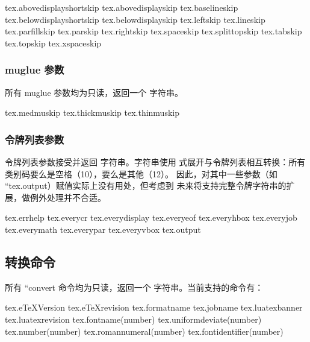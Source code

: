 \startthreecolumns
\begin{typing}
tex.abovedisplayshortskip
tex.abovedisplayskip
tex.baselineskip
tex.belowdisplayshortskip
tex.belowdisplayskip
tex.leftskip
tex.lineskip
tex.parfillskip
tex.parskip
tex.rightskip
tex.spaceskip
tex.splittopskip
tex.tabskip
tex.topskip
tex.xspaceskip
\end{typing}
\stopthreecolumns

\subsubsection{muglue 参数}

所有 muglue 参数均为只读，返回一个 \LUA 字符串。

\startthreecolumns
\begin{typing}
tex.medmuskip
tex.thickmuskip
tex.thinmuskip
\end{typing}
\stopthreecolumns

\subsubsection{令牌列表参数}

令牌列表参数接受并返回 \LUA 字符串。\LUA 字符串使用  
式展开与令牌列表相互转换：所有类别码要么是空格（10），要么是其他（12）。
因此，对其中一些参数（如 ``tex.output）赋值实际上没有用处，但考虑到
未来将支持完整令牌字符串的扩展，做例外处理并不合适。

\startthreecolumns
\begin{typing}
tex.errhelp
tex.everycr
tex.everydisplay
tex.everyeof
tex.everyhbox
tex.everyjob
tex.everymath
tex.everypar
tex.everyvbox
tex.output
\end{typing}
\stopthreecolumns

\subsection{转换命令}


所有 ``convert 命令均为只读，返回一个 \LUA 字符串。当前支持的命令有：

\starttwocolumns
\begin{typing}
tex.eTeXVersion
tex.eTeXrevision
tex.formatname
tex.jobname
tex.luatexbanner
tex.luatexrevision
tex.fontname(number)
tex.uniformdeviate(number)
tex.number(number)
tex.romannumeral(number)
tex.fontidentifier(number)
\end{typing}
\stoptwocolumns


